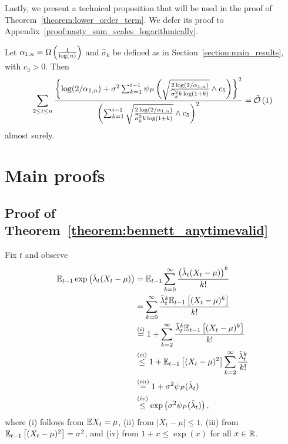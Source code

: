 Lastly, we present a technical proposition that will be used in the proof of Theorem~\ref{theorem:lower_order_term}. We defer its proof to Appendix~\ref{proof:nasty_sum_scales_logarithmically}.

\begin{proposition} \label{proposition:nasty_sum_scales_logarithmically}
    Let $\alpha_{1, n} =  \Omega \left( \frac{1}{\log(n)} \right)$ and $\widehat\sigma_k$ be defined as in Section~\ref{section:main_results}, with $c_3 > 0$. Then
    \begin{align} \label{eq:nasty_sum_scales_logarithmically}
     \sum_{2 \leq i \leq n} \frac{\left\{ \log(2/\alpha_{1,n}) + \sigma^2\sum_{k=1}^{i-1} \psi_P\left(\sqrt\frac{2\log(2/\alpha_{1,n})}{\widehat \sigma_{k}^2 k \log (1+k)}\wedge c_5\right)\right\}^2}{\left( \sum_{k=1}^{i-1} \sqrt\frac{2\log(2/\alpha_{1,n})}{\widehat \sigma_{k}^2 k \log (1+k)} \wedge c_5\right)^2} = \tilde{\mathcal{O}} \left( 1\right)
    \end{align}
almost surely.
\end{proposition}



\section{Main proofs} \label{appendix:main_proofs}

\subsection{Proof of Theorem~\ref{theorem:bennett_anytimevalid}} \label{proof:bennett_anytimevalid}

Fix $t$ and observe
\begin{align*}
    \mathbb{E}_{t-1} \exp \left( \tilde\lambda_t (X_t-\mu)\right) &= \mathbb{E}_{t-1} \sum_{k = 0}^\infty \frac{\left( \tilde\lambda_t (X_t-\mu)\right)^k}{k!} 
    \\&=  \sum_{k = 0}^\infty \frac{\tilde\lambda_t^k \mathbb{E}_{t-1} \left[ (X_t-\mu)^k \right]}{k!}
    \\&\stackrel{(i)}{=} 1 + \sum_{k = 2}^\infty \frac{\tilde\lambda_t^k \mathbb{E}_{t-1} \left[ (X_t-\mu)^k \right]}{k!}
    \\&\stackrel{(ii)}{\leq} 1 + \mathbb{E}_{t-1} \left[ (X_t-\mu)^2 \right]\sum_{k = 2}^\infty \frac{\tilde\lambda_t^k }{k!}
    \\&\stackrel{(iii)}{=} 1 + \sigma^2 \psi_P(\tilde\lambda_t)
    \\&\stackrel{(iv)}{\leq} \exp \left( \sigma^2 \psi_P(\tilde\lambda_t) \right),
\end{align*}
where (i) follows from $\mathbb{E} X_t = \mu$, (ii) from $|X_t- \mu| \leq 1$, (iii) from $\mathbb{E}_{t-1} \left[ (X_t-\mu)^2 \right] = \sigma^2$, and (iv) from $1 + x \leq \exp(x)$ for all $x \in \mathbb{R}$.

